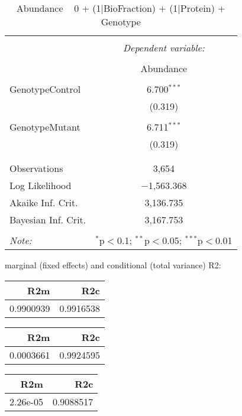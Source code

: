 \documentclass[11pt]{report}
\begin{document}
\begin{table}[!htbp] \centering 
  \caption{Abundance ~ 0 + (1|BioFraction) + (1|Protein) + Genotype} 
  \label{} 
\begin{tabular}{@{\extracolsep{5pt}}lc} 
\\[-1.8ex]\hline 
\hline \\[-1.8ex] 
 & \multicolumn{1}{c}{\textit{Dependent variable:}} \\ 
\cline{2-2} 
\\[-1.8ex] & Abundance \\ 
\hline \\[-1.8ex] 
 GenotypeControl & 6.700$^{***}$ \\ 
  & (0.319) \\ 
  & \\ 
 GenotypeMutant & 6.711$^{***}$ \\ 
  & (0.319) \\ 
  & \\ 
\hline \\[-1.8ex] 
Observations & 3,654 \\ 
Log Likelihood & $-$1,563.368 \\ 
Akaike Inf. Crit. & 3,136.735 \\ 
Bayesian Inf. Crit. & 3,167.753 \\ 
\hline 
\hline \\[-1.8ex] 
\textit{Note:}  & \multicolumn{1}{r}{$^{*}$p$<$0.1; $^{**}$p$<$0.05; $^{***}$p$<$0.01} \\ 
\end{tabular} 
\end{table} 
marginal (fixed effects) and conditional (total variance) R2:

\begin{tabular}{r|r}
\hline
R2m & R2c\\
\hline
0.9900939 & 0.9916538\\
\hline
\end{tabular}

\begin{tabular}{r|r}
\hline
R2m & R2c\\
\hline
0.0003661 & 0.9924595\\
\hline
\end{tabular}

\begin{tabular}{r|r}
\hline
R2m & R2c\\
\hline
2.26e-05 & 0.9088517\\
\hline
\end{tabular}
\end{document}
